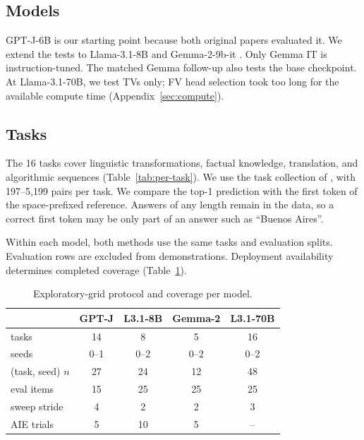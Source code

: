 \documentclass[11pt]{article}
\begin{document}
\subsection{Models}

GPT-J-6B \citep{wang2021gptj} is our starting point because both original papers evaluated it. We extend the tests to Llama-3.1-8B \citep{grattafiori2024llama} and Gemma-2-9b-it \citep{gemmateam2024gemma2}. Only Gemma IT is instruction-tuned. The matched Gemma follow-up also tests the base checkpoint. At Llama-3.1-70B, we test TVs only; FV head selection took too long for the available compute time (Appendix~\ref{sec:compute}).

\subsection{Tasks}

The 16 tasks cover linguistic transformations, factual knowledge, translation, and algorithmic sequences (Table~\ref{tab:per-task}). We use the task collection of \citet{todd2024function}, with 197--5{,}199 pairs per task. We compare the top-1 prediction with the first token of the space-prefixed reference. Answers of any length remain in the data, so a correct first token may be only part of an answer such as ``Buenos Aires''.

Within each model, both methods use the same tasks and evaluation splits. Evaluation rows are excluded from demonstrations. Deployment availability determines completed coverage (Table~\ref{tab:protocol}).

\begin{table}[t]
  \centering
  \scriptsize
  \setlength{\tabcolsep}{2.5pt}
  \begin{tabular}{lcccc}
    \toprule
     & \textbf{GPT-J} & \textbf{L3.1-8B} & \textbf{Gemma-2} & \textbf{L3.1-70B} \\
    \midrule
    tasks & 14 & 8 & 5 & 16 \\
    seeds & 0--1 & 0--2 & 0--2 & 0--2 \\
    (task, seed) $n$ & 27 & 24 & 12 & 48 \\
    eval items & 15 & 25 & 25 & 25 \\
    sweep stride & 4 & 2 & 2 & 3 \\
    AIE trials & 5 & 10 & 5 & -- \\
    \bottomrule
  \end{tabular}
  \caption{Exploratory-grid protocol and coverage per model.}
  \label{tab:protocol}
\end{table}
\end{document}
